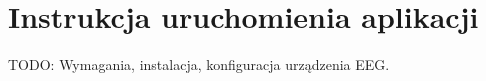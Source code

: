 \chapter{Instrukcja uruchomienia aplikacji}
\label{app:Instrukcja}

TODO: Wymagania, instalacja, konfiguracja urządzenia EEG.
